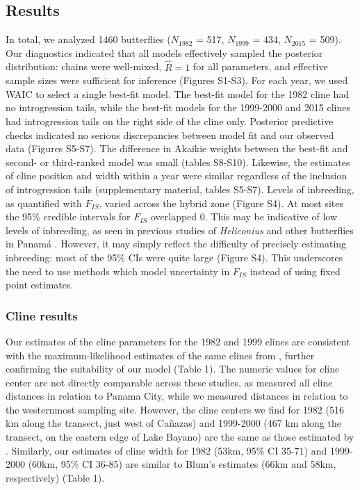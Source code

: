 \documentclass[]{article}
\begin{document}
\subsection{Results}\label{results}

In total, we analyzed 1460 butterflies (\(N_{1982}\) = 517, \(N_{1999}\)
= 434, \(N_{2015}\) = 509). Our diagnostics indicated that all models
effectively sampled the posterior distribution: chains were well-mixed,
\(\hat{R} = 1\) for all parameters, and effective sample sizes were
sufficient for inference (Figures S1-S3). For each year, we used WAIC to
select a single best-fit model. The best-fit model for the 1982 cline
had no introgression tails, while the best-fit models for the 1999-2000
and 2015 clines had introgression tails on the right side of the cline
only. Posterior predictive checks indicated no serious discrepancies
between model fit and our observed data (Figures S5-S7). The difference
in Akaikie weights between the best-fit and second- or third-ranked
model was small (tables S8-S10). Likewise, the estimates of cline
position and width within a year were similar regardless of the
inclusion of introgression tails (supplementary material, tables S5-S7).
Levels of inbreeding, as quantified with \(F_{IS}\), varied across the
hybrid zone (Figure S4). At most sites the 95\% credible intervals for
\(F_{IS}\) overlapped 0. This may be indicative of low levels of
inbreeding, as seen in previous studies of \textit{Heliconius} and other
butterflies in Panamá \citep{Mallet:1986vj,Dasmahapatra2002}. However,
it may simply reflect the difficulty of precisely estimating inbreeding:
most of the 95\% CIs were quite large (Figure S4). This underscores the
need to use methods which model uncertainty in \(F_{IS}\) instead of
using fixed point estimates.

\subsubsection{Cline results}\label{cline-results}

Our estimates of the cline parameters for the 1982 and 1999 clines are
consistent with the maximum-likelihood estimates of the same clines from
\citet{Blum:2002wr}, further confirming the suitability of our model
(Table 1). The numeric values for cline center are not directly
comparable across these studies, as \citeauthor{Blum:2002wr} measured
all cline distances in relation to Panama City, while we measured
distances in relation to the westernmost sampling site. However, the
cline centers we find for 1982 (516 km along the transect, just west of
Cañazas) and 1999-2000 (467 km along the transect, on the eastern edge
of Lake Bayano) are the same as those estimated by \citet{Blum:2002wr}.
Similarly, our estimates of cline width for 1982 (53km, 95\% CI 35-71)
and 1999-2000 (60km, 95\% CI 36-85) are similar to Blum's estimates
(66km and 58km, respectively) (Table 1).
\end{document}
